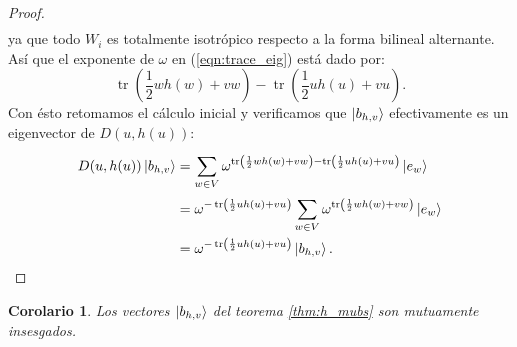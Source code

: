 \documentclass[a4paper]{report}
\DeclareMathOperator{\tr}{tr}
\newtheorem{corollary}{Corolario}
\begin{document}
\begin{proof}
\begin{align}
    \end{align}
    ya que todo $W_i$ es totalmente isotrópico respecto a la
    forma bilineal alternante. Así que el exponente de
    $\omega$ en (\ref{eqn:trace_eig}) está dado por: 
    \begin{equation}
      \tr\left( \frac{1}{2} w h(w) + v w \right)
      - \tr\left( \frac{1}{2} u h(u) + v u \right).
    \end{equation}
    Con ésto retomamos el cálculo inicial y verificamos que
    $\ket{b_{h,v}}$ efectivamente es un eigenvector de
    $D(u,h(u))$:
    \begin{align}
      D(u,h(u)) \ket{b_{h,v}}
      &= \sum_{w \in V}^{}
      \omega^{\tr\left(
          \frac{1}{2} w h(w) + v w
      \right)
      - \tr\left(
        \frac{1}{2} u h(u) + v u
      \right) } \ket{e_w} \\
      &= \omega^{-\tr\left(
          \frac{1}{2} u h(u) + v u
      \right) }
      \sum_{w \in V}^{}
      \omega^{\tr\left(
        \frac{1}{2} w h(w) + v w
      \right) } \ket{e_w} \\
      &= \omega^{-\tr\left(
        \frac{1}{2} u h(u) + v u
      \right) } \ket{b_{h,v}}.
    \end{align}
  \end{proof}
  \begin{corollary}
    Los vectores $\ket{b_{h,v}}$ del teorema
    \ref{thm:h_mubs} son mutuamente insesgados.
  \end{corollary}
\end{document}
